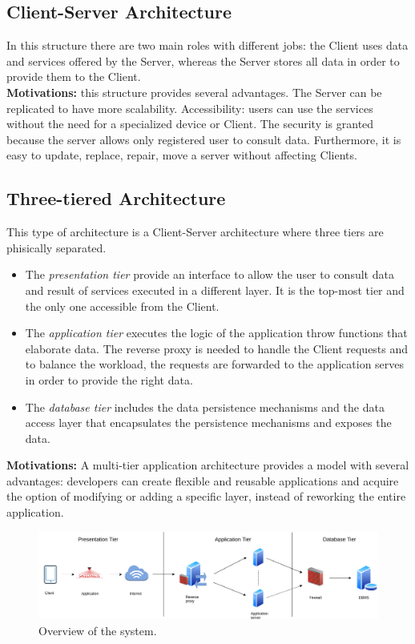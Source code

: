 \documentclass{report}
\begin{document}
\subsection{Client-Server Architecture}
In this structure there are two main roles with different jobs: the Client uses data and services offered by the Server, whereas the Server stores all data in order to provide them to the Client.\\
\textbf{Motivations:} this structure provides several advantages. The Server can be replicated to have more scalability. 
Accessibility: users can use the services without the need for a specialized device or Client.
The security is granted because the server allows only registered user to consult data.
Furthermore, it is easy to update, replace, repair, move a server without affecting Clients.
\subsection{Three-tiered Architecture}
This type of architecture is a Client-Server architecture where three tiers are phisically separated.
\begin{itemize}
	\item The \textit{presentation tier} provide an interface to allow the user to consult data and result of services executed in a different layer. 
	It is the top-most tier and the only one accessible from the Client.
	\item The \textit{application tier} executes the logic of the application throw functions that elaborate data. 
	The reverse proxy is needed to handle the Client requests and to balance the workload, the requests are forwarded to 
	the application serves in order to provide the right data.
	\item The \textit{database tier} includes the data persistence mechanisms and the data access layer that encapsulates 
	the persistence mechanisms and exposes the data.
\end{itemize}
\textbf{Motivations:} A multi-tier application architecture provides a model with several advantages: developers can create flexible and reusable 
applications and acquire the option of modifying or adding a specific layer, instead of reworking the entire application.

\begin{figure}[!ht]
	\begin{center}
	\includegraphics[width=\textwidth]{img/TiersArchitecture.png}
	\end{center}
	\caption{Overview of the system.}
\end{figure}
\end{document}
